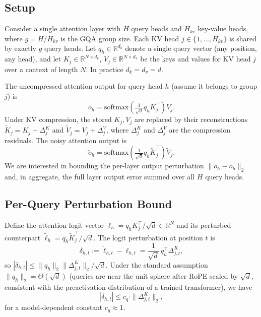 \documentclass[11pt]{article}
\begin{document}
\subsection{Setup}
\label{sec:theory-setup}

Consider a single attention layer with $H$ query heads and $H_{kv}$ key-value
heads, where $g = H / H_{kv}$ is the GQA group size. Each KV head $j \in
\{1, \ldots, H_{kv}\}$ is shared by exactly $g$ query heads. Let
$q_h \in \mathbb{R}^{d_k}$ denote a single query vector (any position, any
head), and let $K_j \in \mathbb{R}^{N \times d_k}$, $V_j \in \mathbb{R}^{N
\times d_v}$ be the keys and values for KV head $j$ over a context of length
$N$. In practice $d_k = d_v = d$.

The uncompressed attention output for query head $h$ (assume it belongs to
group $j$) is
\begin{equation}
\label{eq:attn-clean}
o_h = \mathrm{softmax}\!\left( \tfrac{1}{\sqrt{d}} q_h K_j^\top \right) V_j.
\end{equation}
Under KV compression, the stored $K_j, V_j$ are replaced by their
reconstructions $\tilde K_j = K_j + \Delta^K_j$ and
$\tilde V_j = V_j + \Delta^V_j$, where $\Delta^K_j$ and $\Delta^V_j$ are the
compression residuals.  The noisy attention output is
\begin{equation}
\label{eq:attn-noisy}
\tilde o_h = \mathrm{softmax}\!\left( \tfrac{1}{\sqrt{d}} q_h \tilde K_j^\top \right) \tilde V_j.
\end{equation}
We are interested in bounding the per-layer output perturbation
$\|\tilde o_h - o_h\|_2$ and, in aggregate, the full layer output error
summed over all $H$ query heads.

\subsection{Per-Query Perturbation Bound}
\label{sec:theory-perquery}

Define the attention logit vector $\ell_h = q_h K_j^\top / \sqrt{d}
\in \mathbb{R}^N$ and its perturbed counterpart $\tilde \ell_h =
q_h \tilde K_j^\top / \sqrt{d}$. The logit perturbation at position $t$ is
\begin{equation}
\label{eq:delta-logit}
\delta_{h,t} := \tilde \ell_{h,t} - \ell_{h,t} = \frac{1}{\sqrt{d}}\, q_h^\top \Delta^K_{j,t},
\end{equation}
so $|\delta_{h,t}| \le \|q_h\|_2 \|\Delta^K_{j,t}\|_2 / \sqrt{d}$. Under the
standard assumption $\|q_h\|_2 = \Theta(\sqrt{d})$ (queries are near the unit
sphere after RoPE scaled by $\sqrt{d}$, consistent with the preactivation
distribution of a trained transformer), we have
\begin{equation}
\label{eq:bound-logit}
|\delta_{h,t}| \le c_q \cdot \|\Delta^K_{j,t}\|_2,
\end{equation}
for a model-dependent constant $c_q \approx 1$.
\end{document}
